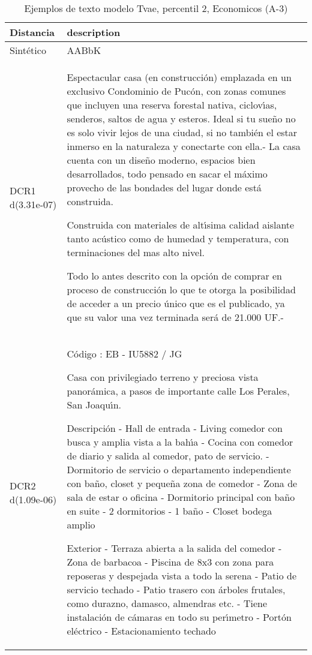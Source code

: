 \begin{table}[H]
\centering
\fontsize{10}{14}\selectfont
\caption{Ejemplos de texto modelo Tvae, percentil 2, Economicos (A-3)}
\label{table-example-economicos-a-3-tvae-2p-text}
\begin{tabular}{|l|m{35em}|}
\hline
\rowcolor[gray]{0.8}
Distancia & description \\
\hline Sintético & AABbK \\
\hline DCR1 d(3.31e-07) & Espectacular casa (en construcci\'on) emplazada  en un exclusivo Condominio de Puc\'on, con zonas comunes que incluyen una reserva forestal nativa, ciclov{\'\i}as, senderos, saltos de agua y esteros. Ideal si tu sue\~no no es solo vivir lejos de una ciudad, si no tambi\'en el estar inmerso en la naturaleza y conectarte con ella.- 
La casa cuenta con un dise\~no moderno, espacios bien desarrollados, todo pensado en sacar el m\'aximo provecho de las bondades del lugar donde est\'a construida. 

Construida con materiales de alt{\'\i}sima calidad aislante tanto ac\'ustico como de humedad y temperatura, con terminaciones del mas alto nivel. 

Todo lo antes descrito con la opci\'on de comprar en proceso de construcci\'on lo que te otorga la posibilidad de acceder a un precio \'unico que es el publicado, ya que su valor una vez terminada ser\'a de 21.000 UF.- \\
\hline DCR2 d(1.09e-06) & C\'odigo : EB - IU5882 / JG

Casa con privilegiado terreno y preciosa vista panor\'amica, a pasos de importante calle Los Perales, San Joaqu{\'\i}n.

Descripci\'on
- Hall de entrada
- Living comedor  con busca y  amplia vista a la bah{\'\i}a
- Cocina con comedor de diario y salida al comedor, pato de servicio.
- Dormitorio de servicio o departamento independiente con ba\~no, closet y peque\~na zona de comedor
- Zona de sala de estar o oficina
- Dormitorio principal con ba\~no en suite
- 2 dormitorios
- 1 ba\~no
- Closet bodega amplio

Exterior
- Terraza abierta a la salida del comedor
- Zona de barbacoa
- Piscina de 8x3 con zona para reposeras y despejada vista a todo la serena
- Patio de servicio techado
- Patio trasero con \'arboles frutales, como durazno, damasco, almendras etc.
- Tiene instalaci\'on de c\'amaras en todo su per{\'\i}metro
- Port\'on el\'ectrico 
- Estacionamiento techado \\
\hline
\end{tabular}
\end{table}
